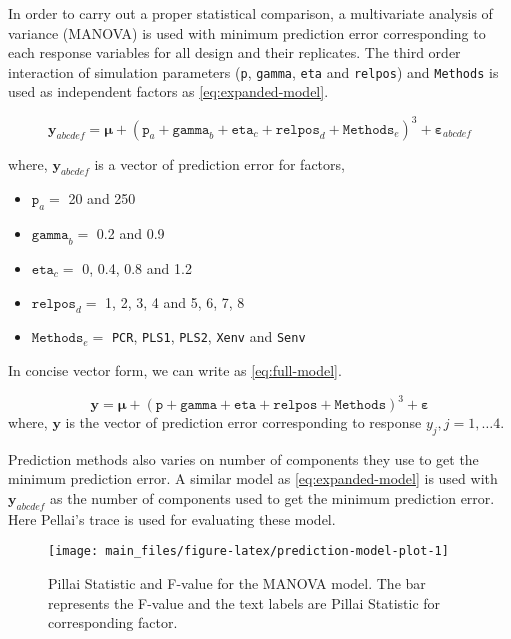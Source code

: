\documentclass[12pt,3p,authoryear]{elsarticle}
\providecommand{\tightlist}{%
  \setlength{\itemsep}{0pt}\setlength{\parskip}{0pt}}
\begin{document}
In order to carry out a proper statistical comparison, a multivariate
analysis of variance (MANOVA) is used with minimum prediction error
corresponding to each response variables for all design and their
replicates. The third order interaction of simulation parameters
(\texttt{p}, \texttt{gamma}, \texttt{eta} and \texttt{relpos}) and
\texttt{Methods} is used as independent factors as
\eqref{eq:expanded-model}.

\begin{equation}
\mathbf{y}_{abcdef} = \boldsymbol{\mu} + (\texttt{p}_a + \texttt{gamma}_b + \texttt{eta}_c + \texttt{relpos}_d + \texttt{Methods}_e)^3 + \boldsymbol{\varepsilon}_{abcdef}
\label{eq:expanded-model}
\end{equation}

where, \(\mathbf{y}_{abcdef}\) is a vector of prediction error for
factors,

\begin{itemize}
\tightlist
\item
  \(\texttt{p}_a =\) 20 and 250
\item
  \(\texttt{gamma}_b=\) 0.2 and 0.9
\item
  \(\texttt{eta}_c=\) 0, 0.4, 0.8 and 1.2
\item
  \(\texttt{relpos}_d=\) 1, 2, 3, 4 and 5, 6, 7, 8
\item
  \(\texttt{Methods}_e=\) \texttt{PCR}, \texttt{PLS1}, \texttt{PLS2},
  \texttt{Xenv} and \texttt{Senv}
\end{itemize}

In concise vector form, we can write as \eqref{eq:full-model}.

\begin{equation}
\mathbf{y} = \boldsymbol{\mu} + (\texttt{p} + \texttt{gamma} + \texttt{eta} + \texttt{relpos} + \texttt{Methods})^3 + \boldsymbol{\varepsilon}
\label{eq:full-model}
\end{equation} where, \(\mathbf{y}\) is the vector of prediction error
corresponding to response \(y_j, j = 1, \ldots 4\).

Prediction methods also varies on number of components they use to get
the minimum prediction error. A similar model as \eqref{eq:expanded-model}
is used with \(\mathbf{y}_{abcdef}\) as the number of components used to
get the minimum prediction error. Here Pellai's trace is used for
evaluating these model.

\begin{figure}
\texttt{[image: main\_files/figure-latex/prediction-model-plot-1]} \caption{Pillai Statistic and F-value for the MANOVA model. The bar represents the F-value and the text labels are Pillai Statistic for corresponding factor.}\label{fig:prediction-model-plot}
\end{figure}
\end{document}
